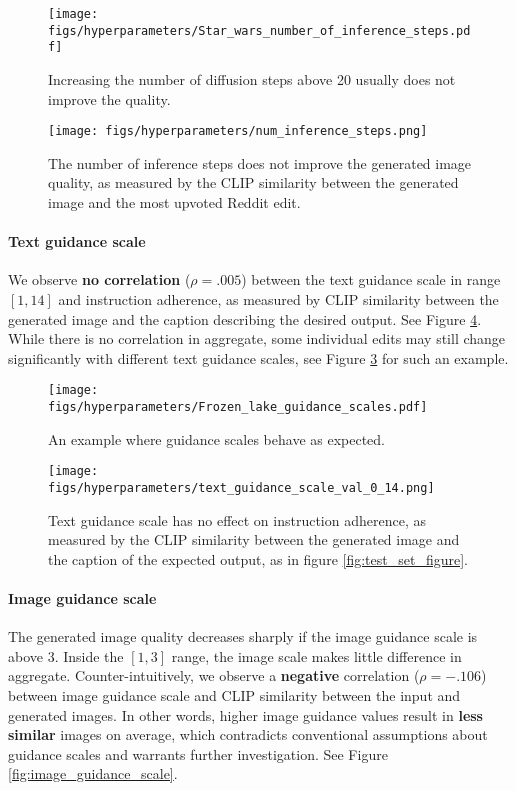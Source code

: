 \begin{figure}[h]
    \centering
    \texttt{[image: figs/hyperparameters/Star\_wars\_number\_of\_inference\_steps.pdf]}
    \caption{Increasing the number of diffusion steps above 20 usually does not improve the quality.}
    \label{fig:inference_steps_example}
\end{figure}

\begin{figure}[h]
    \centering
    \texttt{[image: figs/hyperparameters/num\_inference\_steps.png]}
    \caption{The number of inference steps does not improve the generated image quality, as measured by the CLIP similarity between the generated image and the most upvoted Reddit edit.}
    \label{fig:num_inference_steps}
\end{figure}

\paragraph{Text guidance scale}
We observe \textbf{no correlation} ($\rho=.005$) between the text guidance scale in range $[1,14]$ and instruction adherence, as measured by CLIP similarity between the generated image and the caption describing the desired output. See Figure \ref{fig:text_guidance_scale}. While there is no correlation in aggregate, some individual edits may still change significantly with different text guidance scales, see Figure \ref{fig:guidance_scales_example} for such an example.

\begin{figure}[h]
    \centering
    \texttt{[image: figs/hyperparameters/Frozen\_lake\_guidance\_scales.pdf]}
    \caption{An example where guidance scales behave as expected.}
    \label{fig:guidance_scales_example}
\end{figure}

\begin{figure}[h]
    \centering
    \texttt{[image: figs/hyperparameters/text\_guidance\_scale\_val\_0\_14.png]}
    \caption{Text guidance scale has no effect on instruction adherence, as measured by the CLIP similarity between the generated image and the caption of the expected output, as in figure \ref{fig:test_set_figure}.}
    \label{fig:text_guidance_scale}
\end{figure}

\paragraph{Image guidance scale}
The generated image quality decreases sharply if the image guidance scale is above 3. Inside the $[1,3]$ range, the image scale makes little difference in aggregate. Counter-intuitively, we observe a \textbf{negative} correlation ($\rho=-.106$) between image guidance scale and CLIP similarity between the input and generated images. In other words, higher image guidance values result in \textbf{less similar} images on average, which contradicts conventional assumptions about guidance scales and warrants further investigation. See Figure \ref{fig:image_guidance_scale}.

